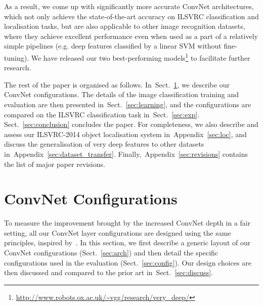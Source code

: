 \documentclass{article} %
\makeatletter
\newcommand{\sref}[1]{Sect.~\ref{#1}}
\newcommand{\apref}[1]{Appendix~\ref{#1}}
\newcommand*{\eg}{e.g.\@\xspace}
\makeatother
\begin{document}
As a result, we come up with significantly more accurate ConvNet architectures, which not only achieve the state-of-the-art accuracy on ILSVRC classification and localisation tasks, but are also applicable to other image recognition datasets, where they achieve excellent performance even when 
used as a part of a relatively simple pipelines (\eg deep features classified by a linear SVM without fine-tuning).
We have released our two best-performing models\footnote{\url{http://www.robots.ox.ac.uk/~vgg/research/very_deep/}} to facilitate further research.

The rest of the paper is organised as follows. In~\sref{sec:arch_config}, we describe our ConvNet configurations.
The details of the image classification training and evaluation are then presented in~\sref{sec:learning}, and the configurations are compared on the ILSVRC classification task in~\sref{sec:exp}. \sref{sec:conclusion} concludes the paper.
For completeness, we also describe and assess our ILSVRC-2014 object localisation system in~\apref{sec:loc}, and discuss the generalisation of very deep features to
other datasets in~\apref{sec:dataset_transfer}. Finally,~\apref{sec:revisions} contains the list of major paper revisions.

\section{ConvNet Configurations}
\label{sec:arch_config}
To measure the improvement brought by the increased ConvNet depth in a fair setting, all our \mbox{ConvNet} layer configurations are designed using the same principles, inspired by~\citet{Ciresan11,Krizhevsky12}.
In this section, we first describe a generic layout of our \mbox{ConvNet} configurations (\sref{sec:arch}) and then detail the specific configurations used in the evaluation (\sref{sec:config}).
Our design choices are then discussed and compared to the prior art in~\sref{sec:discuss}.
\end{document}
